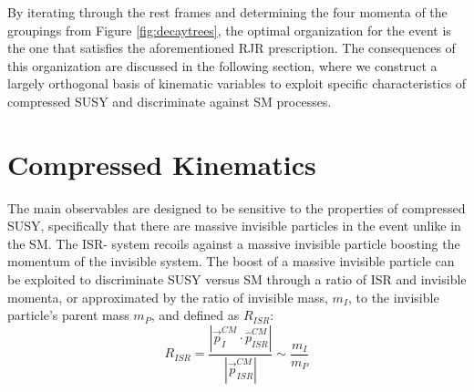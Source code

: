 By iterating through the rest frames and determining the four momenta of the groupings from Figure \ref{fig:decaytrees}, the optimal organization for the event is the one that satisfies the aforementioned RJR prescription. The consequences of this organization are discussed in the following section, where we construct a largely orthogonal basis of kinematic variables to exploit specific characteristics of compressed SUSY and discriminate against SM processes.




\section{Compressed Kinematics}

The main observables are designed to be sensitive to the properties of compressed SUSY, specifically that there are massive invisible particles in the event unlike in the SM. The ISR- system recoils against a massive invisible particle boosting the momentum of the invisible system.  The boost of a massive invisible particle can be exploited to discriminate SUSY versus SM through a ratio of ISR and invisible momenta, or approximated by the ratio of invisible mass, $m_I$, to the invisible particle's parent mass $m_P$, and defined as $R_{ISR}$:
\begin{equation}
R_{ISR} = \frac{|\vec{p}_I^{CM} \cdot \hat{p}_{ISR}^{CM}|}{|\vec{p}_{ISR}^{CM}|} \sim \frac{m_I}{m_P}
\end{equation}

